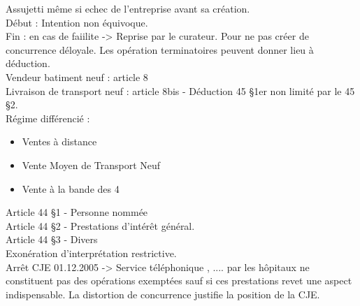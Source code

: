 \documentclass{book}
\begin{document}
Assujetti même si echec de l'entreprise avant sa création.\\

Début : Intention non équivoque.\\

Fin : en cas de faiilite -> Reprise par le curateur. Pour ne pas créer de concurrence déloyale. Les opération terminatoires peuvent donner lieu à déduction.\\

Vendeur batiment neuf : article 8\\

Livraison de transport neuf : article 8bis - Déduction 45 §1er non limité par le 45 §2.\\

Régime différencié :\\

\begin{itemize}
\item Ventes à distance
\item Vente Moyen de Transport Neuf
\item Vente à la bande des 4
\end{itemize}

\null

Article 44 §1 - Personne nommée\\
Article 44 §2 - Prestations d'intérêt général.\\
Article 44 §3 - Divers\\

Exonération d'interprétation restrictive.\\

Arrêt CJE 01.12.2005 -> Service téléphonique , .... par les hôpitaux ne constituent pas des opérations exemptées sauf si ces prestations revet une aspect indispensable. La distortion de concurrence justifie la position de la CJE.\\

















   
\nocite{*}

\end{document}
